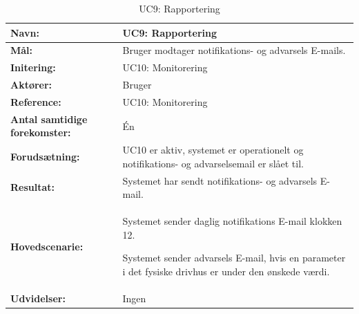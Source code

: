 \begin{table}[h]
\begin{tabularx}{\textwidth}{| >{\raggedright\arraybackslash}p{3.3 cm} | >{\raggedright\arraybackslash}X |} \hline

\textbf{Navn:} 						& UC9: Rapportering\\ \hline
\textbf{Mål:}						& Bruger modtager notifikations- og advarsels E-mails. \\ \hline
\textbf{Initering:}					& UC10: Monitorering \\ \hline
\textbf{Aktører:} 					& Bruger \\ \hline
\textbf{Reference:} 					& UC10: Monitorering \\ \hline
\textbf{Antal samtidige forekomster:} & Én \\ \hline
\textbf{Forudsætning:} 				& UC10 er aktiv, systemet er operationelt og notifikations- og advarselsemail er slået til. \\ \hline
\textbf{Resultat:}					& Systemet har sendt notifikations- og advarsels E-mail. \\ \hline
\textbf{Hovedscenarie:}				& 

\begin{packed_enum}
\item Systemet sender daglig notifikations E-mail klokken 12.
\item Systemet sender advarsels E-mail, hvis en parameter i det fysiske drivhus er under den ønskede værdi. 
\end{packed_enum}
\\ \hline
\textbf{Udvidelser:}				&  
Ingen \\ \hline
\end{tabularx}
\caption{UC9: Rapportering}
\label{tbl:UC9}
\end{table}

\clearpage
 
